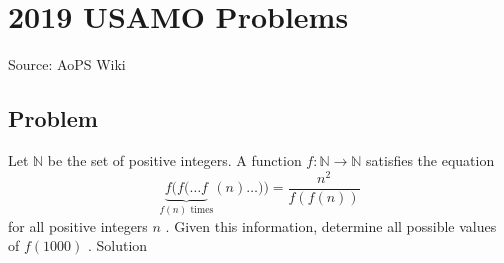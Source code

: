 \documentclass[12pt]{article}
\begin{document}
\section*{{2019 USAMO Problems}}
Source: AoPS Wiki

\subsection*{Problem}
Let $\mathbb{N}$ be the set of positive integers. A function $f:\mathbb{N}\to\mathbb{N}$ satisfies the equation \[\underbrace{f(f(\ldots f}_{f(n)\text{ times}}(n)\ldots))=\frac{n^2}{f(f(n))}\] for all positive integers $n$ . Given this information, determine all possible values of $f(1000)$ . Solution
\end{document}
